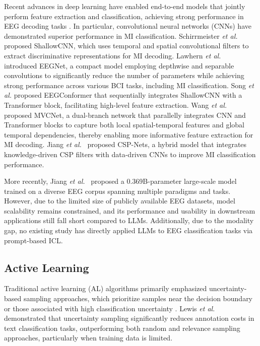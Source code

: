 \documentclass[journal,twocolumn]{IEEEtran}
\begin{document}
Recent advances in deep learning have enabled end-to-end models that jointly perform feature extraction and classification, achieving strong performance in EEG decoding tasks \cite{craik2019deep, shoeibi2021epileptic}. In particular, convolutional neural networks (CNNs) have demonstrated superior performance in MI classification. Schirrmeister \textit{et al.}~\cite{schirrmeister2017deep} proposed ShallowCNN, which uses temporal and spatial convolutional filters to extract discriminative representations for MI decoding. Lawhern \textit{et al.}~\cite{EEGNet} introduced EEGNet, a compact model employing depthwise and separable convolutions to significantly reduce the number of parameters while achieving strong performance across various BCI tasks, including MI classification. Song \textit{et al.} \cite{song2022conformer} proposed EEGConformer that sequentially integrates ShallowCNN with a Transformer block, facilitating high-level feature extraction. Wang \textit{et al.}~\cite{wang2025mvcnet} proposed MVCNet, a dual-branch network that parallelly integrates CNN and Transformer blocks to capture both local spatial-temporal features and global temporal dependencies, thereby enabling more informative feature extraction for MI decoding. Jiang \textit{et al.}~\cite{jiang2024csp} proposed CSP-Nets, a hybrid model that integrates knowledge-driven CSP filters with data-driven CNNs to improve MI classification performance.

More recently, Jiang \textit{et al.}~\cite{jiang2024large} proposed a 0.369B-parameter large-scale model trained on a diverse EEG corpus spanning multiple paradigms and tasks. However, due to the limited size of publicly available EEG datasets, model scalability remains constrained, and its performance and usability in downstream applications still fall short compared to LLMs. Additionally, due to the modality gap, no existing study has directly applied LLMs to EEG classification tasks via prompt-based ICL.

\subsection{Active Learning}

Traditional active learning (AL) algorithms primarily emphasized uncertainty-based sampling approaches, which prioritize samples near the decision boundary or those associated with high classification uncertainty \cite{Settles2009}. Lewis \textit{et al.}~\cite{lewis1995sequential} demonstrated that uncertainty sampling significantly reduces annotation costs in text classification tasks, outperforming both random and relevance sampling approaches, particularly when training data is limited.
\end{document}
